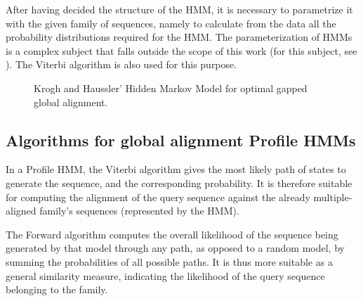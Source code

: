 After having decided the structure of the HMM, it is necessary to parametrize it with the given family of sequences, namely to calculate from the data all the probability distributions required for the HMM. The parameterization of HMMs is a complex subject that falls outside the scope of this work (for this subject, see \cite{hmmsbook}). The Viterbi algorithm is also used for this purpose.


\begin{figure}[htb!]
  \begin{center}
    \caption[HMM of Krogh-Haussler] {Krogh and Haussler' Hidden Markov Model for optimal gapped global alignment.}
    \label{krogh-haussler-model}
  \end{center}
\end{figure}





\subsection{Algorithms for global alignment Profile HMMs}

In a Profile HMM, the Viterbi algorithm gives the most likely path of states to generate the sequence, and the corresponding probability. It is therefore suitable for computing the alignment of the query sequence against the already multiple-aligned family's sequences (represented by the HMM). 

The Forward algorithm computes the overall likelihood of the sequence being generated by that model through any path, as opposed to a random model, by summing the probabilities of all possible paths. It is thus more suitable as a general similarity measure, indicating the likelihood of the query sequence belonging to the family.

